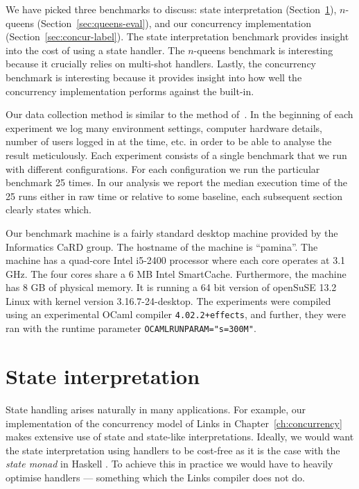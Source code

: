\documentclass[12pt,mscres,cdtppar,twoside,openright,logo,rightchapter,normalheadings]{infthesis}
\theoremstyle{definition}
\begin{document}
We have picked three benchmarks to discuss: state interpretation
(Section~\ref{sec:state-eval}), $n$-queens
(Section~\ref{sec:queens-eval}), and our concurrency implementation
(Section~\ref{sec:concur-label}). The state interpretation
benchmark provides insight into the cost of using a state handler. The
$n$-queens benchmark is interesting because it crucially relies on
multi-shot handlers. Lastly, the concurrency benchmark is interesting
because it provides insight into how well the concurrency
implementation performs against the built-in.

Our data collection method is similar to the method
of~\cite{Harris2016}. In the beginning of each experiment we log many
environment settings, computer hardware details, number of users
logged in at the time, etc. in order to be able to analyse the result
meticulously. Each experiment consists of a single benchmark that we
run with different configurations. For each configuration we run the
particular benchmark 25 times. In our analysis we report the median
execution time of the 25 runs either in raw time or relative to some
baseline, each subsequent section clearly states which.

Our benchmark machine is a fairly standard desktop machine provided by
the Informatics CaRD group. The hostname of the machine is
``pamina''. The machine has a quad-core Intel i5-2400 processor where
each core operates at 3.1 GHz. The four cores share a 6 MB Intel
SmartCache. Furthermore, the machine has 8 GB of physical memory. It
is running a 64 bit version of openSuSE 13.2 Linux with kernel version
3.16.7-24-desktop. The experiments were compiled using an experimental
OCaml compiler \texttt{4.02.2+effects}, and further, they were ran
with the runtime parameter \texttt{OCAMLRUNPARAM="s=300M"}.
%

\section{State interpretation}
\label{sec:state-eval}

State handling arises naturally in many applications. For example, our
implementation of the concurrency model of Links in
Chapter~\ref{ch:concurrency} makes extensive use of state and
state-like interpretations. Ideally, we would want the state
interpretation using handlers to be cost-free as it is the case with
the \emph{state monad} in Haskell \citep{Kammar2013}. To achieve this
in practice we would have to heavily optimise handlers --- something
which the Links compiler does not do.
\end{document}
